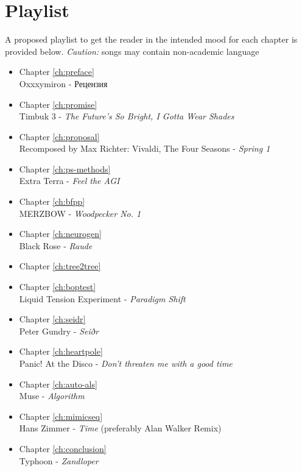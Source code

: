 \chapter{Playlist}
\label{apdx:playlist}

A proposed playlist to get the reader in the intended mood for each chapter is provided below.
\emph{Caution:} songs may contain non-academic language

\begin{itemize}
    \item Chapter \ref{ch:preface}  \\ Oxxxymiron - \foreignlanguage{russian}{Рецензия}
    \item Chapter \ref{ch:promise}  \\ Timbuk 3 - \emph{The Future's So Bright, I Gotta Wear Shades}
    \item Chapter \ref{ch:proposal}  \\ Recomposed by Max Richter: Vivaldi, The Four Seasons - \emph{Spring 1}
    \item Chapter \ref{ch:ps-methods}  \\ Extra Terra - \emph{Feel the AGI} 
    \item Chapter \ref{ch:bfpp}  \\ MERZBOW - \emph{Woodpecker No. 1} 
    \item Chapter \ref{ch:neurogen}  \\ Black Rose - \emph{Raude}
    \item Chapter \ref{ch:tree2tree}  \\ 
    \item Chapter \ref{ch:boptest}  \\ Liquid Tension Experiment - \emph{Paradigm Shift}
    \item Chapter \ref{ch:seidr}  \\ Peter Gundry - \emph{Seiðr}
    \item Chapter \ref{ch:heartpole}  \\ Panic! At the Disco - \emph{Don't threaten me with a good time}
    \item Chapter \ref{ch:auto-als}  \\ Muse - \emph{Algorithm}
    \item Chapter \ref{ch:mimicseq}  \\ Hans Zimmer - \emph{Time} (preferably Alan Walker Remix)
    \item Chapter \ref{ch:conclusion}  \\ Typhoon - \emph{Zandloper}
\end{itemize}